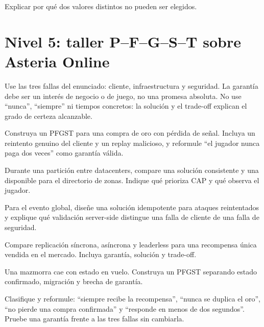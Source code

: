 \documentclass[variant=guia,cover=institutional,mode=screen]{ua-engineering-v6-article}
\begin{document}
\begin{uaexercise}
Explicar por qué dos valores distintos no pueden ser elegidos.
\end{uaexercise}

\section{Nivel 5: taller P--F--G--S--T sobre Asteria Online}
Use las tres fallas del enunciado: cliente, infraestructura y seguridad. La
garantía debe ser un interés de negocio o de juego, no una promesa absoluta.
No use ``nunca'', ``siempre'' ni tiempos concretos: la solución y el trade-off
explican el grado de certeza alcanzable.

\begin{uaexercise}
Construya un PFGST para una compra de oro con pérdida de señal. Incluya un
reintento genuino del cliente y un replay malicioso, y reformule ``el jugador
nunca paga dos veces'' como garantía válida.
\end{uaexercise}
\begin{uaexercise}
Durante una partición entre datacenters, compare una solución consistente y
una disponible para el directorio de zonas. Indique qué prioriza CAP y qué
observa el jugador.
\end{uaexercise}
\begin{uaexercise}
Para el evento global, diseñe una solución idempotente para ataques reintentados
y explique qué validación server-side distingue una falla de cliente de una
falla de seguridad.
\end{uaexercise}
\begin{uaexercise}
Compare replicación síncrona, asíncrona y leaderless para una recompensa única
vendida en el mercado. Incluya garantía, solución y trade-off.
\end{uaexercise}
\begin{uaexercise}
Una mazmorra cae con estado en vuelo. Construya un PFGST separando estado
confirmado, migración y brecha de garantía.
\end{uaexercise}
\begin{uaexercise}
Clasifique y reformule: ``siempre recibe la recompensa'', ``nunca se duplica
el oro'', ``no pierde una compra confirmada'' y ``responde en menos de dos
segundos''. Pruebe una garantía frente a las tres fallas sin cambiarla.
\end{uaexercise}
\end{document}

